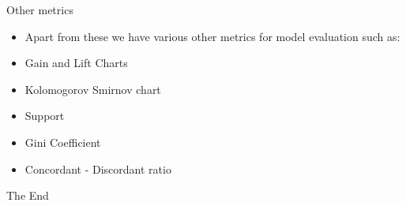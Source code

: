 \documentclass{beamer}
\begin{document}
\begin{frame}{Other metrics}
\begin{flushleft}
	\begin{itemize}
		\item Apart from these we have various other metrics for model evaluation such as:
		\item Gain and Lift Charts	
		\item Kolomogorov Smirnov chart
		\item Support
		\item Gini Coefficient
		\item Concordant - Discordant ratio
	\end{itemize}
\end{flushleft}
\end{frame}

\begin{frame}
\huge{\centerline{The End}}
\end{frame}
\end{document}

